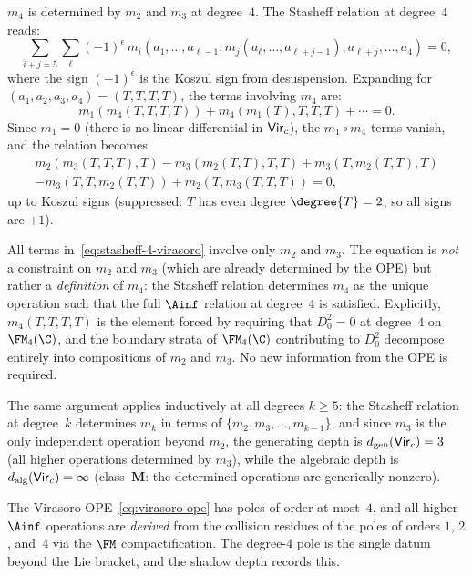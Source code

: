 \begin{verification}
\label{ver:virasoro-m4}
$m_4$ is determined by $m_2$ and $m_3$ at
degree~$4$. The Stasheff relation at degree~$4$ reads:
\begin{equation}\label{eq:stasheff-4}
 \sum_{i+j = 5} \sum_{\ell}
 (-1)^{\epsilon}\, m_i(a_1, \ldots, a_{\ell-1},
 m_j(a_\ell, \ldots, a_{\ell+j-1}),
 a_{\ell+j}, \ldots, a_4) = 0,
\end{equation}
where the sign $(-1)^{\epsilon}$ is the Koszul sign from
desuspension. Expanding for $(a_1, a_2, a_3, a_4) =
(T, T, T, T)$, the terms involving $m_4$ are:
\[
 m_1(m_4(T,T,T,T))
 + m_4(m_1(T), T, T, T) + \cdots = 0.
\]
Since $m_1 = 0$ (there is no linear differential in
$\mathsf{Vir}_c$), the $m_1 \circ m_4$ terms vanish, and the
relation becomes
\begin{multline}\label{eq:stasheff-4-virasoro}
 m_2(m_3(T,T,T), T) - m_3(m_2(T,T), T, T)
 + m_3(T, m_2(T,T), T) \\
 - m_3(T, T, m_2(T,T))
 + m_2(T, m_3(T,T,T)) = 0,
\end{multline}
up to Koszul signs (suppressed: $T$ has even degree
$\degree{T} = 2$, so all signs are $+1$).

All terms in~\eqref{eq:stasheff-4-virasoro} involve only
$m_2$ and $m_3$. The equation is \emph{not} a constraint on
$m_2$ and $m_3$ (which are already determined by the OPE) but
rather a \emph{definition} of $m_4$: the Stasheff relation
determines $m_4$ as the unique operation such that the full
$\Ainf$ relation at degree~$4$ is satisfied. Explicitly,
$m_4(T,T,T,T)$ is the element forced by requiring that
$D_0^2 = 0$ at degree~$4$ on $\FM_4(\C)$, and the boundary
strata of $\FM_4(\C)$ contributing to $D_0^2$ decompose
entirely into compositions of $m_2$ and $m_3$. No new
information from the OPE is required.

The same argument applies inductively at all degrees $k \ge 5$:
the Stasheff relation at degree~$k$ determines $m_k$ in terms
of $\{m_2, m_3, \ldots, m_{k-1}\}$, and since $m_3$ is the
only independent operation beyond $m_2$, the generating depth is
$d_{\mathrm{gen}}(\mathsf{Vir}_c) = 3$ (all higher operations determined
by $m_3$), while the algebraic depth is
$d_{\mathrm{alg}}(\mathsf{Vir}_c) = \infty$ (class~$\mathbf{M}$: the
determined operations are generically nonzero).

The Virasoro OPE~\eqref{eq:virasoro-ope} has poles of order at
most~$4$, and all higher $\Ainf$ operations are
\emph{derived} from the collision residues of the poles
of orders $1$, $2$, and~$4$ via the $\FM$ compactification.
The degree-$4$ pole is the single datum beyond the Lie bracket,
and the shadow depth records this.
\end{verification}



